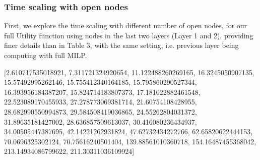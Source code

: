 \subsubsection*{Time scaling with open nodes}	

First, we explore the time scaling with different number of open nodes, for our full Utility function using nodes in the last two layers (Layer 1 and 2), providing finer details than in Table 3, with the same setting, i.e. previous layer being computing with full MILP.


[2.610717535018921, 7.311721324920654, 11.122488260269165, 16.3245050907135, 15.57492995262146, 15.755412340164185, 15.795860290527344, 16.393956184387207, 15.824714183807373, 17.181022882461548, 22.523089170455933, 27.278773069381714, 21.60754108428955, 28.682990550994873, 29.584508419036865, 24.55262804031372, 31.89635181427002, 28.636857509613037, 30.416080236434937, 34.00505447387695, 42.14221262931824, 47.62732434272766, 62.65820622444153, 70.0696325302124, 70.75616240501404, 139.88561010360718, 154.16487455368042, 213.14934086799622, 211.30311036109924]


